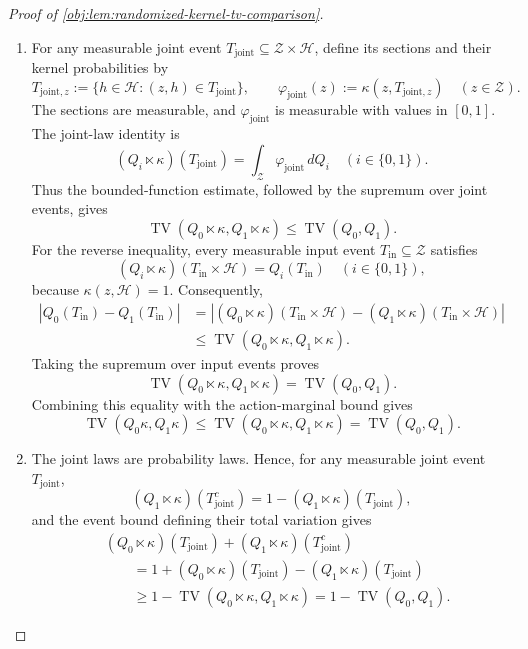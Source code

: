 \documentclass[11pt]{article}
\begin{document}
\begin{proof}[Proof of \cref{obj:lem:randomized-kernel-tv-comparison}]
\begin{enumerate}
\item For any measurable joint event \(T_{\mathrm{joint}}\subseteq\mathcal Z\times\mathcal H\), define its sections and their kernel probabilities by
\[
T_{\mathrm{joint},z}
:=
\{h\in\mathcal H:(z,h)\in T_{\mathrm{joint}}\},
\qquad
\varphi_{\mathrm{joint}}(z)
:=
\kappa(z,T_{\mathrm{joint},z})
\quad(z\in\mathcal Z).
\]
The sections are measurable, and \(\varphi_{\mathrm{joint}}\) is measurable with values in \([0,1]\). The joint-law identity is
\[
(Q_i\ltimes\kappa)(T_{\mathrm{joint}})
=
\int_{\mathcal Z}\varphi_{\mathrm{joint}}\,dQ_i
\quad(i\in\{0,1\}).
\]
Thus the bounded-function estimate, followed by the supremum over joint events, gives
\[
\operatorname{TV}(Q_0\ltimes\kappa,Q_1\ltimes\kappa)
\le \operatorname{TV}(Q_0,Q_1).
\]
For the reverse inequality, every measurable input event \(T_{\mathrm{in}}\subseteq\mathcal Z\) satisfies
\[
(Q_i\ltimes\kappa)(T_{\mathrm{in}}\times\mathcal H)
=
Q_i(T_{\mathrm{in}})
\quad(i\in\{0,1\}),
\]
because \(\kappa(z,\mathcal H)=1\). Consequently,
\[
\begin{aligned}
|Q_0(T_{\mathrm{in}})-Q_1(T_{\mathrm{in}})|
&=
\left|
(Q_0\ltimes\kappa)(T_{\mathrm{in}}\times\mathcal H)
-
(Q_1\ltimes\kappa)(T_{\mathrm{in}}\times\mathcal H)
\right|\\
&\le
\operatorname{TV}(Q_0\ltimes\kappa,Q_1\ltimes\kappa).
\end{aligned}
\]
Taking the supremum over input events proves
\[
\operatorname{TV}(Q_0\ltimes\kappa,Q_1\ltimes\kappa)
=
\operatorname{TV}(Q_0,Q_1).
\]
Combining this equality with the action-marginal bound gives
\[
\operatorname{TV}(Q_0\kappa,Q_1\kappa)
\le
\operatorname{TV}(Q_0\ltimes\kappa,Q_1\ltimes\kappa)
=
\operatorname{TV}(Q_0,Q_1).
\]

\item The joint laws are probability laws. Hence, for any measurable joint event \(T_{\mathrm{joint}}\),
\[
(Q_1\ltimes\kappa)(T_{\mathrm{joint}}^c)
=
1-(Q_1\ltimes\kappa)(T_{\mathrm{joint}}),
\]
and the event bound defining their total variation gives
\[
\begin{aligned}
&(Q_0\ltimes\kappa)(T_{\mathrm{joint}})
 +(Q_1\ltimes\kappa)(T_{\mathrm{joint}}^c)\\
&\qquad=
1+(Q_0\ltimes\kappa)(T_{\mathrm{joint}})
 -(Q_1\ltimes\kappa)(T_{\mathrm{joint}})\\
&\qquad\ge
1-\operatorname{TV}(Q_0\ltimes\kappa,Q_1\ltimes\kappa)
=
1-\operatorname{TV}(Q_0,Q_1).
\end{aligned}
\]


\end{enumerate}
\end{proof}
\end{document}
